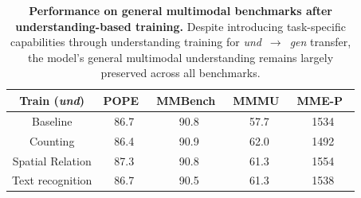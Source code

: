 \begin{table}[t]
    \centering
    \begin{tabular}{c|cccc}
        \toprule
       \rowcolor{white}
        \textbf{Train (\textit{und})} 
        & \textbf{POPE}~\cite{li2023pope}
        & \textbf{MMBench}~\cite{liu2024mmbench}
        & \textbf{MMMU}~\cite{yue2024mmmu}
        & \textbf{MME-P}~\cite{fu2023mme}
        \\
        \midrule
        Baseline & 86.7 & 90.8 & 57.7 & 1534\\
        Counting & 86.4 & 90.9 & 62.0 & 1492\\
        Spatial Relation & 87.3 & 90.8 & 61.3 & 1554\\
        Text recognition & 86.7 & 90.5 & 61.3 & 1538 \\
        \bottomrule
    \end{tabular}
    \vspace{6pt}
    \caption{\textbf{Performance on general multimodal benchmarks after understanding-based training.} Despite introducing task-specific capabilities through understanding training for \textit{und}~$\rightarrow$~\textit{gen} transfer, the model's general multimodal understanding remains largely preserved across all benchmarks.}
    \label{tab:general_bench}
    \vspace{-10pt}
\end{table}




